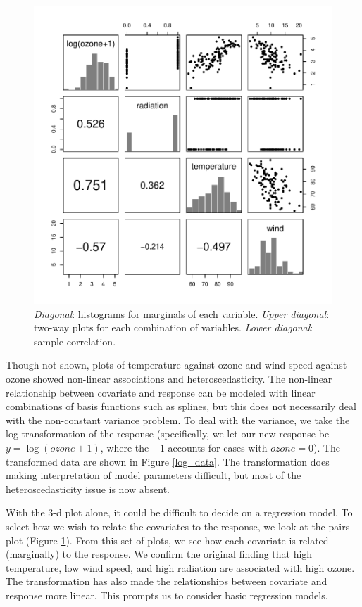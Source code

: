 \documentclass{asaproc}
\begin{document}
\begin{figure}
\begin{center}
\includegraphics[scale=0.55]{figs/pairs.pdf}
\caption{\emph{Diagonal}: histograms for marginals of each variable. \emph{Upper diagonal}: two-way plots for each combination of variables. \emph{Lower diagonal}: sample correlation.}
\label{pairs}
\end{center}
\end{figure}

Though not shown, plots of temperature against ozone and wind speed against ozone showed non-linear associations and heteroscedasticity. The non-linear relationship between covariate and response can be modeled with linear combinations of basis functions such as splines, but this does not necessarily deal with the non-constant variance problem. To deal with the variance, we take the log transformation of the response (specifically, we let our new response be $y=\log(ozone+1)$, where the $+1$ accounts for cases with $ozone=0$). The transformed data are shown in Figure \ref{log_data}. The transformation does making interpretation of model parameters difficult, but most of the heteroscedasticity issue is now absent.

With the 3-d plot alone, it could be difficult to decide on a regression model. To select how we wish to relate the covariates to the response, we look at the pairs plot (Figure \ref{pairs}). From this set of plots, we see how each covariate is related (marginally) to the response. We confirm the original finding that high temperature, low wind speed, and high radiation are associated with high ozone. The transformation has also made the relationships between covariate and response more linear. This prompts us to consider basic regression models.
\end{document}
